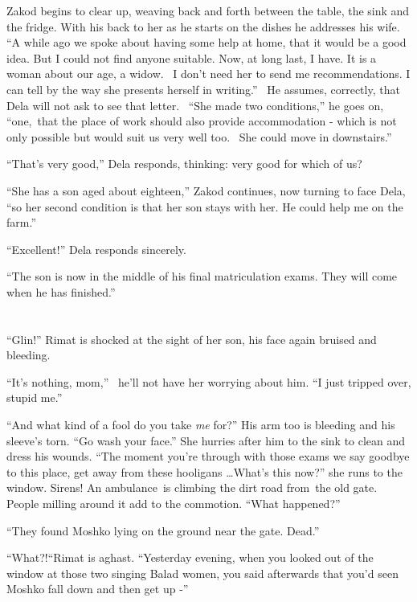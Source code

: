 \documentclass[twoside,11pt]{book}
\begin{document}
Zakod begins to clear up, weaving back and forth between the table, the sink and the fridge. With his back to her as he
starts on the dishes he addresses his wife. ``A while ago we spoke about having some help at home, that it
would be a good idea. But I could not find anyone suitable. Now, at long last, I have. It is a woman about our age, a
widow.~ I don't need her to send me recommendations. I can tell by the way she presents herself in
writing.'' \ He assumes, correctly, that Dela will not ask to see that letter. \ ``She made
two conditions,'' he goes on, ``one,~that the place of work should also provide accommodation - which is
not only possible but would suit us very well too.~ She could move in downstairs.''

``That's very good,'' Dela responds, thinking: very good for which of us?

``She has a son aged about eighteen,'' Zakod continues, now turning to face Dela,
``so her second condition is that her son stays with her. He could help me on the farm.''

``Excellent!'' Dela responds sincerely.

{}``The son is now in the middle of his final matriculation exams. They will come when he has finished.''


\bigskip

\chapter{}

``Glin!'' Rimat is shocked at the sight of her son, his face again bruised and bleeding.

``It's nothing, mom,'' \ he'll not have her worrying about him. ``I just tripped over, stupid
me.''

``And what kind of a fool do you take \textit{me} for?'' His arm too is bleeding and his
sleeve's torn. ``Go wash your face.'' She hurries after him to the sink to clean and dress
his wounds. ``The moment you're through with those exams we say goodbye to this place, get away from these
hooligans {\dots}What's this now?'' she runs to the window. Sirens! An ambulance~is climbing the dirt road
from~the old gate. People milling around it add to the commotion. ``What happened?''

``They found Moshko lying on the ground near the gate. Dead.''

``What?!``Rimat is aghast{. }``Yesterday evening, when you looked
out of the window at those two singing Balad women, you said afterwards that you'd seen Moshko fall down and then get
up -''
\end{document}
